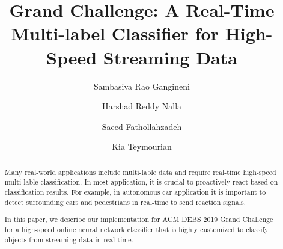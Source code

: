 \documentclass[sigconf]{acmart}
\begin{document}
%
\title{Grand Challenge: A Real-Time Multi-label Classifier for High-Speed Streaming Data}

%



\author{Sambasiva Rao Gangineni}

\author{Harshad Reddy Nalla}


\author{Saeed Fathollahzadeh}

\author{Kia Teymourian}



%
\renewcommand{\shortauthors}{Kia Teymourian, et al.}

%
\begin{abstract}
Many real-world applications include multi-lable data and require real-time high-speed multi-lable classification. In most application, it is crucial to proactively react based on classification results. For example, in autonomous car application it is important to detect surrounding cars and pedestrians in real-time to send reaction signals. 

In this paper, we describe our implementation for ACM DEBS 2019 Grand Challenge for a high-speed online neural network classifier that is highly customized to classify objects from streaming data in real-time.
\end{abstract}
\end{document}
